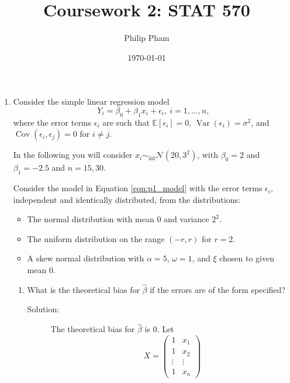 \documentclass[letterpaper,11pt]{article}
\title{Coursework 2: STAT 570}
\author{Philip Pham}
\date{\today}
\begin{document}
\maketitle
\begin{enumerate}
\item Consider the simple linear regression model
  \begin{equation*}
    Y_i = \beta_0 + \beta_1x_i + \epsilon_i,~i = 1,\ldots,n,
    \label{eqn:p1_model}    
  \end{equation*}
  where the error terms $\epsilon_i$ are such that
  $\mathbb{E}\left[\epsilon_i\right] = 0$,
  $\operatorname{Var}\left(\epsilon_i\right) = \sigma^2$, and
  $\operatorname{Cov}\left(\epsilon_i, \epsilon_j\right) = 0$ for $i \neq j$.

  In the following you will consider
  $x_i \sim_{\mathrm{iid}} \mathcal{N}\left(20, 3^2\right)$, with $\beta_0 = 2$
  and $\beta_1 = -2.5$ and $n=15,30$.

  Consider the model in Equation \ref{eqn:p1_model} with the error terms
  $\epsilon_i$, independent and identically distributed, from the distributions:
  \begin{itemize}
  \item The normal distribution with mean $0$ and variance $2^2$.
  \item The uniform distribution on the range $(-r,r)$ for $r = 2$.
  \item A skew normal distribution with $\alpha = 5$, $\omega = 1$, and $\xi$
    chosen to given mean $0$.
  \end{itemize}

  \begin{enumerate}
  \item What is the theoretical bias for $\hat{\beta}$ if the errors are of the
    form specified?

    \begin{description}
    \item[Solution:] The theoretical bias for $\hat{\beta}$ is $0$. Let
      \begin{equation}
        X = \begin{pmatrix}
          1 & x_1 \\
          1 & x_2 \\
          \vdots & \vdots \\
          1 & x_n
        \end{pmatrix}
        \label{eqn:p1_X}
      \end{equation}
      

\end{description}
\end{enumerate}
\end{enumerate}
\end{document}
